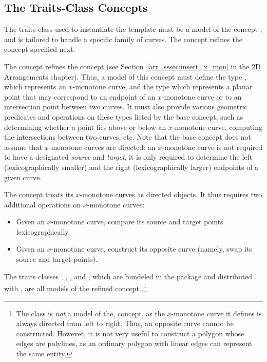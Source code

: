 \subsection{The Traits-Class Concepts}
\label{bops_ssec:traits_concepts}

The traits class used to instantiate the 
template must be a model of the concept
, and is tailored to handle a specific 
family of curves. The concept  refines the 
concept  specified next.

The concept  refines the 
concept  (see 
Section~\ref{arr_sssec:insert_x_mon} in the 2D Arrangements chapter).
Thus, a model of this concept must define the type , 
which represents an $x$-monotone curve, and the type  
which represents a planar point that may correspond to an endpoint of an
$x$-monotone curve or to an intersection point between two curves.
It must also provide various geometric predicates and operations 
on these types listed by the base concept, such as determining whether
a point lies above or below an $x$-monotone curve, computing the intersections
between two curves, etc. Note that the base concept does not assume that 
$x$-monotone curves are directed: an $x$-monotone curve is not required
to have a designated {\em source} and {\em target}, it is only required to
determine the left (lexicographically smaller) and the right
(lexicographically larger) endpoints of a given curve.

The  concept treats its
$x$-monotone curves as directed objects. It thus requires two additional
operations on $x$-monotone curves:
\begin{itemize}
\item Given an $x$-monotone curve, compare its source and target points
lexicographically.
\item Given an $x$-monotone curve, construct its opposite curve (namely,
swap its source and target points).
\end{itemize}

The traits classes , 
, ,
 and , which are 
bundeled in the  package and distributed with \cgal,
are all models of the refined concept 
.\footnote{The
 class is {\em not} a model of the, 
 concept, as the
$x$-monotone curve it defines is always directed from left to right. Thus, an
opposite curve cannot be constructed. However, it is not very useful to
construct a polygon whose edges are polylines, as an ordinary polygon
with linear edges can represent the same entity.}

